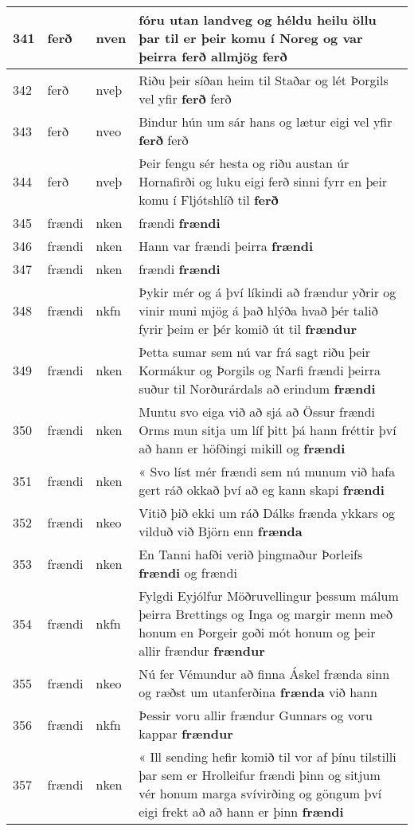 \documentclass{article}
\begin{document}
\begin{longtable}{p{1cm}|p{1cm}|p{1cm}|p{13cm}}
\hline
341&ferð&nven&fóru utan landveg og héldu heilu öllu þar til er þeir komu í Noreg og var þeirra ferð allmjög \textbf{ferð} \\
\hline
342&ferð&nveþ&Riðu þeir síðan heim til Staðar og lét Þorgils vel yfir \textbf{ferð} ferð\\
\hline
343&ferð&nveo&Bindur hún um sár hans og lætur eigi vel yfir \textbf{ferð} ferð\\
\hline
344&ferð&nveþ&Þeir fengu sér hesta og riðu austan úr Hornafirði og luku eigi ferð sinni fyrr en þeir komu í Fljótshlíð til \textbf{ferð} \\
\hline
345&frændi&nken&frændi \textbf{frændi} \\
\hline
346&frændi&nken&Hann var frændi þeirra \textbf{frændi} \\
\hline
347&frændi&nken&frændi \textbf{frændi} \\
\hline
348&frændi&nkfn&Þykir mér og á því líkindi að frændur yðrir og vinir muni mjög á það hlýða hvað þér talið fyrir þeim er þér komið út til \textbf{frændur} \\
\hline
349&frændi&nken&Þetta sumar sem nú var frá sagt riðu þeir Kormákur og Þorgils og Narfi frændi þeirra suður til Norðurárdals að erindum \textbf{frændi} \\
\hline
350&frændi&nken&Muntu svo eiga við að sjá að Össur frændi Orms mun sitja um líf þitt þá hann fréttir því að hann er höfðingi mikill og \textbf{frændi} \\
\hline
351&frændi&nken&« Svo líst mér frændi sem nú munum við hafa gert ráð okkað því að eg kann skapi \textbf{frændi} \\
\hline
352&frændi&nkeo&Vitið þið ekki um ráð Dálks frænda ykkars og vilduð við Björn enn \textbf{frænda} \\
\hline
353&frændi&nken&En Tanni hafði verið þingmaður Þorleifs \textbf{frændi} og frændi\\
\hline
354&frændi&nkfn&Fylgdi Eyjólfur Möðruvellingur þessum málum þeirra Brettings og Inga og margir menn með honum en Þorgeir goði mót honum og þeir allir frændur \textbf{frændur} \\
\hline
355&frændi&nkeo&Nú fer Vémundur að finna Áskel frænda sinn og ræðst um utanferðina \textbf{frænda} við hann\\
\hline
356&frændi&nkfn&Þessir voru allir frændur Gunnars og voru kappar \textbf{frændur} \\
\hline
357&frændi&nken&« Ill sending hefir komið til vor af þínu tilstilli þar sem er Hrolleifur frændi þinn og sitjum vér honum marga svívirðing og göngum því eigi frekt að að hann er þinn \textbf{frændi} \\

\end{longtable}
\end{document}
